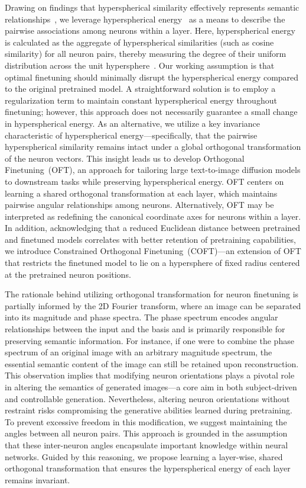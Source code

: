 Drawing on findings that hyperspherical similarity effectively represents semantic relationships~\cite{liu2017deep,liu2018decoupled,chen2020angular}, we leverage hyperspherical energy~\cite{liu2018learning} as a means to describe the pairwise associations among neurons within a layer. Here, hyperspherical energy is calculated as the aggregate of hyperspherical similarities (such as cosine similarity) for all neuron pairs, thereby measuring the degree of their uniform distribution across the unit hypersphere~\cite{liu2021learning}. Our working assumption is that optimal finetuning should minimally disrupt the hyperspherical energy compared to the original pretrained model. A straightforward solution is to employ a regularization term to maintain constant hyperspherical energy throughout finetuning; however, this approach does not necessarily guarantee a small change in hyperspherical energy. As an alternative, we utilize a key invariance characteristic of hyperspherical energy—specifically, that the pairwise hyperspherical similarity remains intact under a global orthogonal transformation of the neuron vectors. This insight leads us to develop Orthogonal Finetuning~(OFT), an approach for tailoring large text-to-image diffusion models to downstream tasks while preserving hyperspherical energy. OFT centers on learning a shared orthogonal transformation at each layer, which maintains pairwise angular relationships among neurons. Alternatively, OFT may be interpreted as redefining the canonical coordinate axes for neurons within a layer. In addition, acknowledging that a reduced Euclidean distance between pretrained and finetuned models correlates with better retention of pretraining capabilities, we introduce Constrained Orthogonal Finetuning~(COFT)—an extension of OFT that restricts the finetuned model to lie on a hypersphere of fixed radius centered at the pretrained neuron positions.

The rationale behind utilizing orthogonal transformation for neuron finetuning is partially informed by the 2D Fourier transform, where an image can be separated into its magnitude and phase spectra. The phase spectrum encodes angular relationships between the input and the basis and is primarily responsible for preserving semantic information. For instance, if one were to combine the phase spectrum of an original image with an arbitrary magnitude spectrum, the essential semantic content of the image can still be retained upon reconstruction. This observation implies that modifying neuron orientations plays a pivotal role in altering the semantics of generated images—a core aim in both subject-driven and controllable generation. Nevertheless, altering neuron orientations without restraint risks compromising the generative abilities learned during pretraining. To prevent excessive freedom in this modification, we suggest maintaining the angles between all neuron pairs. This approach is grounded in the assumption that these inter-neuron angles encapsulate important knowledge within neural networks. Guided by this reasoning, we propose learning a layer-wise, shared orthogonal transformation that ensures the hyperspherical energy of each layer remains invariant.

